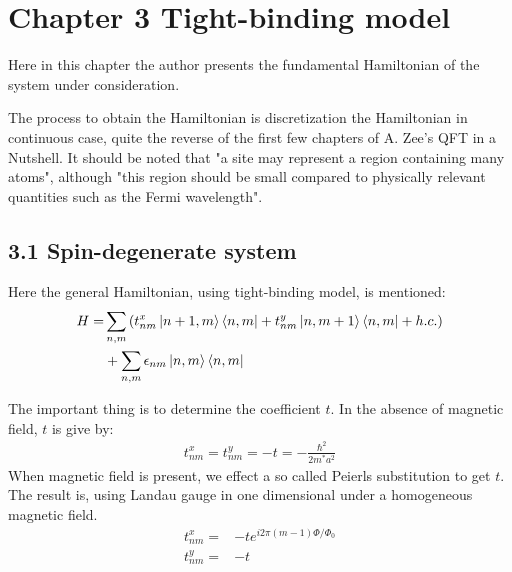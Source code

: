 \documentclass{article}
\numberwithin{equation}{subsection} %
\theoremstyle{definition}
\begin{document}
\section{Chapter 3 Tight-binding model}
\label{sec:Chapter_3_Tight-binding_model}

Here in this chapter the author presents the fundamental Hamiltonian of
the system under consideration.

The process to obtain the Hamiltonian is discretization the Hamiltonian
in continuous case, quite the reverse of the first few chapters of
A. Zee's QFT in a Nutshell. It should be noted that "a site may represent 
a region containing many atoms", although "this region should be small 
compared to physically relevant quantities such as the Fermi wavelength".

    \subsection{3.1 Spin-degenerate system}
    \label{sec:3.1_Spin-degenerate_system}
    Here the general Hamiltonian, using tight-binding model, is
    mentioned:
    \begin{align}
        H = &\sum_{n,m} 
            \left( t^x_{nm}\ket{n+1,m}\bra{n,m}
                +t^y_{nm}\ket{n,m+1}\bra{n,m}+h.c.\right)\nonumber\\
            &+\sum_{n,m} \epsilon_{nm}\ket{n,m}\bra{n,m}
    \end{align}

    The important thing is to determine the coefficient $t$.
    In the absence of magnetic field, $t$ is give by:
    \begin{align}
        t^x_{nm}=t^y_{nm}=-t=-\frac{\hbar^2}{2m^* a^2}
    \end{align}
    When magnetic field is present, we effect a so called Peierls
    substitution to get $t$.
    The result is, using Landau gauge in one dimensional under a
    homogeneous magnetic field.
    \begin{align}
        t^x_{nm} =& -t e^{i2\pi (m-1) \Phi/\Phi_0} \\
        t^y_{nm} =& -t
    \end{align}
\end{document}
